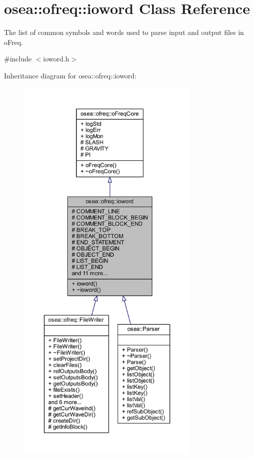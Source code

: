 \hypertarget{classosea_1_1ofreq_1_1ioword}{\section{osea\-:\-:ofreq\-:\-:ioword Class Reference}
\label{classosea_1_1ofreq_1_1ioword}
}


The list of common symbols and words used to parse input and output files in o\-Freq.  




{\ttfamily \#include $<$ioword.\-h$>$}



Inheritance diagram for osea\-:\-:ofreq\-:\-:ioword\-:
\nopagebreak
\begin{figure}[H]
\begin{center}
\leavevmode
\includegraphics[height=550pt]{classosea_1_1ofreq_1_1ioword__inherit__graph}
\end{center}
\end{figure}
